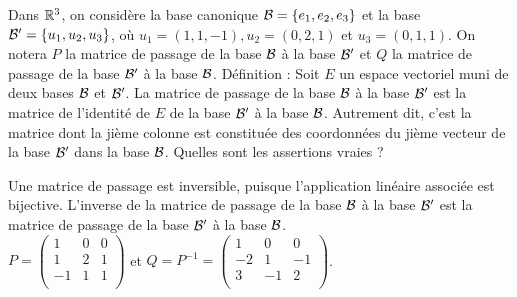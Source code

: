 \begin{question}
Dans $\mathbb{R}^3$, on considère la base canonique ${\cal {B}} =\{e_1,e_2,e_3\}$ et  la base ${\cal {B'}} =\{u_1,u_2,u_3\}$, où 
$u_1=(1,1,-1), u_2=(0,2,1)$ et $u_3=(0,1,1)$. On notera $P$ la matrice de passage de la base ${\cal {B}}$ à la base ${\cal {B'}}$ et $Q$ la matrice de passage de la base ${\cal {B'}}$ à la base ${\cal {B}}$.
\vskip0mm
Définition : Soit $E$ un espace vectoriel muni de deux bases ${\cal {B}}$ et ${\cal {B}}'$.
La matrice de passage de la base ${\cal {B}}$ à la base  ${\cal {B}}'$ est la matrice de l'identité de $E$ de la base 
${\cal {B}}'$ à la base  ${\cal {B}}$. Autrement dit, c'est la matrice dont la jième colonne 
est constituée des coordonnées du jième vecteur de la base ${\cal {B}'}$ dans la base  ${\cal {B}}$.
\vskip2mm
Quelles sont les assertions vraies ?
\begin{answers}  
\end{answers}
\begin{explanations} Une matrice de passage est inversible, puisque l'application linéaire associée est bijective. L'inverse de la matrice de passage de la base ${\cal {B}}$ à la base ${\cal {B}}'$ est la matrice de passage de la base ${\cal {B}}'$ à la base ${\cal {B}}$.\\
$P = \left(\begin{array}{rcc}
1&0&0\\
1&2&1\\ 
-1&1&1\\ 
\end{array}\right)$ et $
Q = P^{-1} = \left(\begin{array}{rcc}
1&0&0\\
-2&1&-1\\ 
3&-1&2\\ 
\end{array}\right)$.
\end{explanations}
\end{question}


